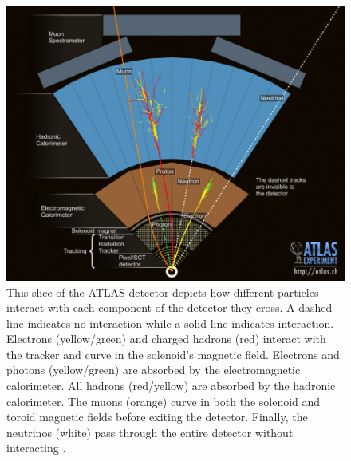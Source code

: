 \begin{figure}[!htbp] 
\begin{center}
\includegraphics[width=0.9\linewidth]{figures/atlas/detector_interactions}
\caption{This slice of the ATLAS detector depicts how different particles
interact with each component of the detector they cross.  A dashed line
indicates no interaction while a solid line indicates interaction. Electrons
(yellow/green) and charged hadrons (red) interact with the tracker and curve in
the solenoid's magnetic field.  Electrons and photons (yellow/green) are
absorbed by the electromagnetic calorimeter.  All hadrons (red/yellow) are
absorbed by the hadronic calorimeter. The muons (orange) curve in both the
solenoid and toroid magnetic fields before exiting the detector. Finally, the
neutrinos (white) pass through the entire detector without interacting
\cite{Pasztor:2048697}.} 
\label{fig:detector_interactions}
 \end{center}
\end{figure}

 
 



